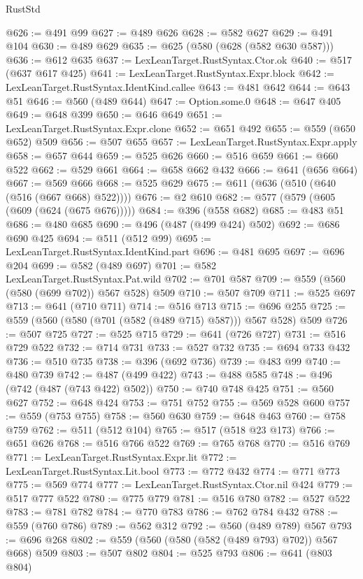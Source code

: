 \begin{lexlean}{RustStd}
\begin{coremodule}
@626 := @491 @99
@627 := @489 @626
@628 := @582 @627
@629 := @491 @104
@630 := @489 @629
@635 := @625 (@580 (@628 (@582 @630 @587)))
@636 := @612 @635
@637 := LexLeanTarget.RustSyntax.Ctor.ok
@640 := @517 (@637 @617 @425)
@641 := LexLeanTarget.RustSyntax.Expr.block
@642 := LexLeanTarget.RustSyntax.IdentKind.callee
@643 := @481 @642
@644 := @643 @51
@646 := @560 (@489 @644)
@647 := Option.some.{0}
@648 := @647 @405
@649 := @648 @399
@650 := @646 @649
@651 := LexLeanTarget.RustSyntax.Expr.clone
@652 := @651 @492
@655 := @559 (@650 @652) @509
@656 := @507 @655
@657 := LexLeanTarget.RustSyntax.Expr.apply
@658 := @657 @644
@659 := @525 @626
@660 := @516 @659
@661 := @660 @522
@662 := @529 @661
@664 := @658 @662 @432
@666 := @641 (@656 @664)
@667 := @569 @666
@668 := @525 @629
@675 := @611 (@636 (@510 (@640 (@516 (@667 @668) @522))))
@676 := @2 @610
@682 := @577 (@579 (@605 (@609 (@624 (@675 @676)))))
@684 := @396 (@558 @682)
@685 := @483 @51
@686 := @480 @685
@690 := @496 (@487 (@499 @424) @502)
@692 := @686 @690 @425
@694 := @511 (@512 @99)
@695 := LexLeanTarget.RustSyntax.IdentKind.part
@696 := @481 @695
@697 := @696 @204
@699 := @582 (@489 @697)
@701 := @582 LexLeanTarget.RustSyntax.Pat.wild
@702 := @701 @587
@709 := @559 (@560 (@580 (@699 @702)) @567 @528) @509
@710 := @507 @709
@711 := @525 @697
@713 := @641 (@710 @711)
@714 := @516 @713
@715 := @696 @255
@725 := @559 (@560 (@580 (@701 (@582 (@489 @715) @587))) @567 @528) @509
@726 := @507 @725
@727 := @525 @715
@729 := @641 (@726 @727)
@731 := @516 @729 @522
@732 := @714 @731
@733 := @527 @732
@735 := @694 @733 @432
@736 := @510 @735
@738 := @396 (@692 @736)
@739 := @483 @99
@740 := @480 @739
@742 := @487 (@499 @422)
@743 := @488 @585
@748 := @496 (@742 (@487 (@743 @422) @502))
@750 := @740 @748 @425
@751 := @560 @627
@752 := @648 @424
@753 := @751 @752
@755 := @569 @528 @600
@757 := @559 (@753 @755)
@758 := @560 @630
@759 := @648 @463
@760 := @758 @759
@762 := @511 (@512 @104)
@765 := @517 (@518 @23 @173)
@766 := @651 @626
@768 := @516 @766 @522
@769 := @765 @768
@770 := @516 @769
@771 := LexLeanTarget.RustSyntax.Expr.lit
@772 := LexLeanTarget.RustSyntax.Lit.bool
@773 := @772 @432
@774 := @771 @773
@775 := @569 @774
@777 := LexLeanTarget.RustSyntax.Ctor.nil @424
@779 := @517 @777 @522
@780 := @775 @779
@781 := @516 @780
@782 := @527 @522
@783 := @781 @782
@784 := @770 @783
@786 := @762 @784 @432
@788 := @559 (@760 @786)
@789 := @562 @312
@792 := @560 (@489 @789) @567
@793 := @696 @268
@802 := @559 (@560 (@580 (@582 (@489 @793) @702)) @567 @668) @509
@803 := @507 @802
@804 := @525 @793
@806 := @641 (@803 @804)

\end{coremodule}
\end{lexlean}
